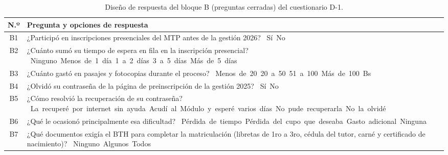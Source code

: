 \begin{table}[H]
    \centering
    \caption{Diseño de respuesta del bloque B (preguntas cerradas) del cuestionario D-1.}
    \label{tab:d1_cerradas}
    \renewcommand{\arraystretch}{1.60}
    \begin{tabularx}{\textwidth}{c L}
        \toprule
        \textbf{N.º} & \textbf{Pregunta y opciones de respuesta} \\
        \midrule
        B1 & ¿Participó en inscripciones presenciales del MTP antes de la gestión 2026?\newline
            \mbox{\casilla{} Sí}\quad \mbox{\casilla{} No} \\
        \addlinespace
        B2 & ¿Cuánto sumó su tiempo de espera en fila en la inscripción presencial?\newline
            \mbox{\casilla{} Ninguno}\quad \mbox{\casilla{} Menos de 1 día}\quad \mbox{\casilla{} 1 a 2 días}\quad \mbox{\casilla{} 3 a 5 días}\quad \mbox{\casilla{} Más de 5 días} \\
        \addlinespace
        B3 & ¿Cuánto gastó en pasajes y fotocopias durante el proceso?\newline
            \mbox{\casilla{} Menos de 20}\quad \mbox{\casilla{} 20 a 50}\quad \mbox{\casilla{} 51 a 100}\quad \mbox{\casilla{} Más de 100 Bs} \\
        \addlinespace
        B4 & ¿Olvidó su contraseña de la página de preinscripción de la gestión 2025?\newline
            \mbox{\casilla{} Sí}\quad \mbox{\casilla{} No} \\
        \addlinespace
        B5 & ¿Cómo resolvió la recuperación de su contraseña?\newline
            \mbox{\casilla{} La recuperé por internet sin ayuda}\quad \mbox{\casilla{} Acudí al Módulo y esperé varios días}\quad \mbox{\casilla{} No pude recuperarla}\quad \mbox{\casilla{} No la olvidé} \\
        \addlinespace
        B6 & ¿Qué le ocasionó principalmente esa dificultad?\newline
            \mbox{\casilla{} Pérdida de tiempo}\quad \mbox{\casilla{} Pérdida del cupo que deseaba}\quad \mbox{\casilla{} Gasto adicional}\quad \mbox{\casilla{} Ninguna} \\
        \addlinespace
        B7 & ¿Qué documentos exigía el BTH para completar la matriculación (libretas de 1ro a 3ro, cédula del tutor, carné y certificado de nacimiento)?\newline
            \mbox{\casilla{} Ninguno}\quad \mbox{\casilla{} Algunos}\quad \mbox{\casilla{} Todos} \\

\end{tabularx}
\end{table}
